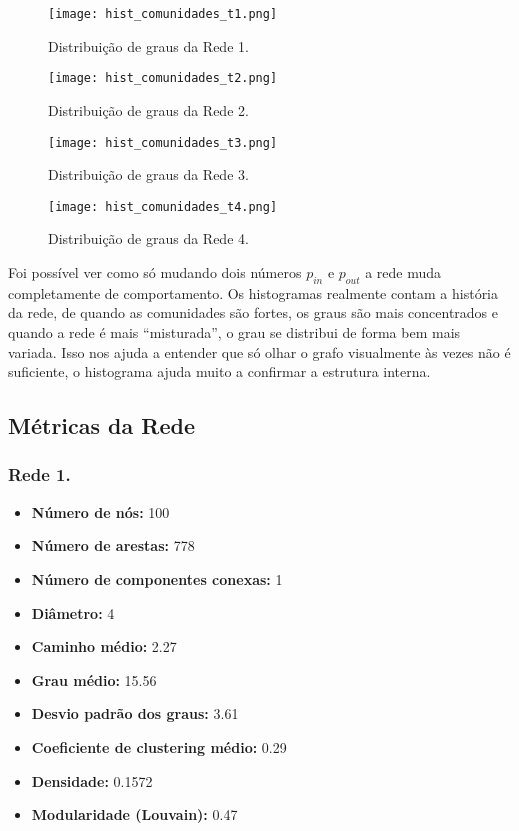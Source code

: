 \documentclass[a4paper]{article}
\begin{document}
\begin{figure}[h]
\centering
\texttt{[image: hist\_comunidades\_t1.png]}
\caption{Distribuição de graus da Rede 1.}
\end{figure}

\begin{figure}[h]
\centering
\texttt{[image: hist\_comunidades\_t2.png]}
\caption{Distribuição de graus da Rede 2.}
\end{figure}

\newpage

\begin{figure}[h]
\centering
\texttt{[image: hist\_comunidades\_t3.png]}
\caption{Distribuição de graus da Rede 3.}
\end{figure}

\begin{figure}[h]
\centering
\texttt{[image: hist\_comunidades\_t4.png]}
\caption{Distribuição de graus da Rede 4.}
\end{figure}

Foi possível ver como só mudando dois números \(p_{in}\) e \(p_{out}\) a rede muda completamente de comportamento. Os histogramas realmente contam a história da rede, de quando as comunidades são fortes, os graus são mais concentrados e quando a rede é mais “misturada”, o grau se distribui de forma bem mais variada. Isso nos ajuda a entender que só olhar o grafo visualmente às vezes não é suficiente, o histograma ajuda muito a confirmar a estrutura interna.
\newpage

\subsection*{Métricas da Rede}

\subsubsection{Rede 1.}
\begin{itemize}
    \item \textbf{Número de nós:} 100
    \item \textbf{Número de arestas:} 778
    \item \textbf{Número de componentes conexas:} 1
    \item \textbf{Diâmetro:} 4
    \item \textbf{Caminho médio:} 2.27
    \item \textbf{Grau médio:} 15.56
    \item \textbf{Desvio padrão dos graus:} 3.61
    \item \textbf{Coeficiente de clustering médio:} 0.29
    \item \textbf{Densidade:} 0.1572
    \item \textbf{Modularidade (Louvain):} 0.47
\end{itemize}
\end{document}
